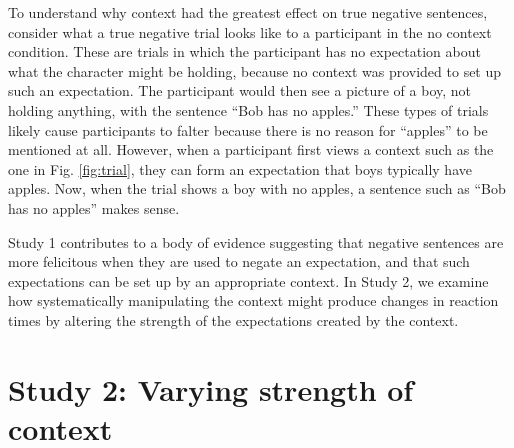 \documentclass[10pt,letterpaper]{article}
\begin{document}
To understand why context had the greatest effect on true negative sentences, consider what a true negative trial looks like to a participant in the no context condition.  These are trials in which the participant has no expectation about what the character might be holding, because no context was provided to set up such an expectation.  The participant would then see a picture of a boy, not holding anything, with the sentence ``Bob has no apples.''  These types of trials likely cause participants to falter because there is no reason for ``apples'' to be mentioned at all.  However, when a participant first views a context such as the one in Fig. \ref{fig:trial}, they can form an expectation that boys typically have apples.  Now, when the trial shows a boy with no apples, a sentence such as ``Bob has no apples'' makes sense.

Study 1 contributes to a body of evidence suggesting that negative sentences are more felicitous when they are used to negate an expectation, and that such expectations can be set up by an appropriate context.  In Study 2, we examine how systematically manipulating the context might produce changes in reaction times by altering the strength of the expectations created by the context.  





\section{Study 2: Varying strength of context}
\end{document}
